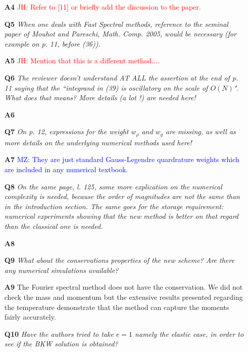 \documentclass[11pt]{article}
\newcommand{\jh}[1]{\textcolor{red}{JH: #1}}
\newcommand{\mz}[1]{\textcolor{blue}{MZ: #1}}
\begin{document}
\begin{itemize}
\item[{\bf A4}] \jh{Refer to [11] or briefly add the discussion to the paper.}

\item[{\bf Q5}] {\it When one deals with Fast Spectral methods, reference to the seminal paper of Mouhot and Pareschi, Math. Comp. 2005, would be necessary (for example on p. 11, before (36)).}

\item[{\bf A5}] \jh{Mention that this is a different method....}


\item[{\bf Q6}] {\it The reviewer doesn't understand AT ALL the assertion at the end of p. 11 saying that the ``integrand in (39) is oscillatory on the scale of $O(N)$". What does that means? More details (a lot !) are needed here!}

\item[{\bf A6}] 

\item[{\bf Q7}] {\it On p. 12, expressions for the weight $w_{\rho}$ and $w_g$ are missing, as well as more details on the underlying numerical methods used here!}

\item[{\bf A7}] \mz{They are just standard Gauss-Legendre quardrature weights which are included in any numerical textbook.}

\item[{\bf Q8}] {\it On the same page, l. 125, some more explication on the numerical complexity is needed, because the order of magnitudes are not the same than in the introduction section. The same goes for the storage requirement: numerical experiments showing that the new method is better on that regard than the classical one is needed.
}

\item[{\bf A8}] 

\item[{\bf Q9}] {\it What about the conservations properties of the new scheme? Are there any numerical simulations available?
}

\item[{\bf A9}] The Fourier spectral method does not have the conservation. We did not check the mass and momentum but the extensive results presented regarding the temperature demonstrate that the method can capture the moments fairly accurately. 


\item[{\bf Q10}] {\it Have the authors tried to take $e=1$ namely the elastic case, in order to see if the BKW solution is obtained?
}


\end{itemize}
\end{document}
